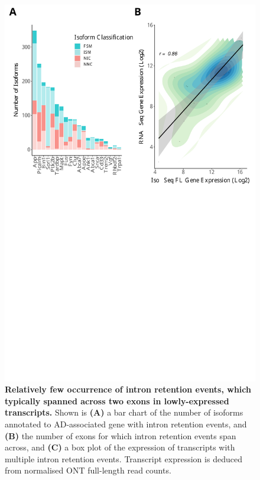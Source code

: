 \begin{figure}[]
	\centering
	\includegraphics[page=11,trim={0 0cm 0 0cm},clip,scale = 0.55]{Figures/ONTvsIsoSeq.pdf}
	\captionsetup{width=0.95\textwidth}
	\caption[Characterisation of intron retention events in AD-associated genes]%
	{\textbf{Relatively few occurrence of intron retention events, which typically spanned across two exons in lowly-expressed transcripts.} Shown is \textbf{(A)} a bar chart of the number of isoforms annotated to AD-associated gene with intron retention events, and \textbf{(B)} the number of exons for which intron retention events span across, and \textbf{(C)} a box plot of the expression of transcripts with multiple intron retention events. Transcript expression is deduced from normalised ONT full-length read counts.}
	\label{fig:IR_targeted}
\end{figure}
\restoregeometry

